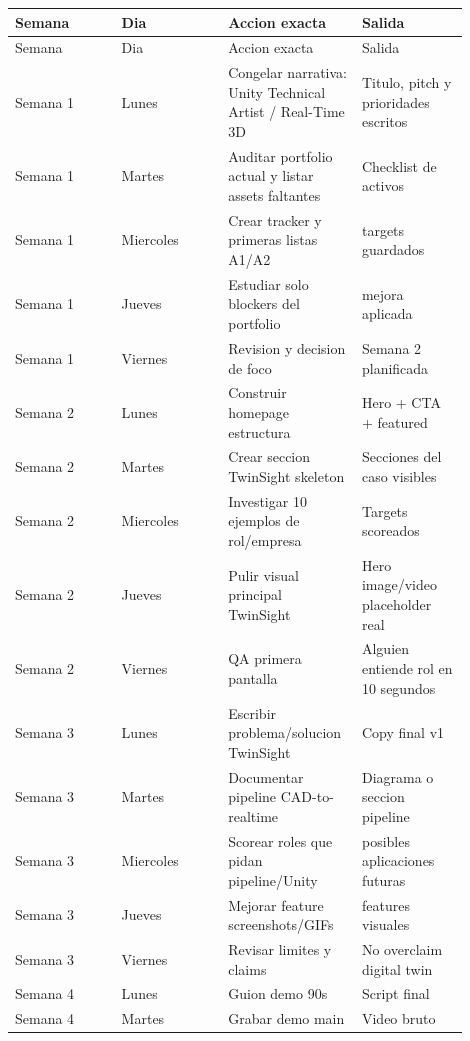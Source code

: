 \begin{center}
\scriptsize
\begin{longtable}{>{\raggedright\arraybackslash}p{0.225\linewidth} >{\raggedright\arraybackslash}p{0.225\linewidth} >{\raggedright\arraybackslash}p{0.225\linewidth} >{\raggedright\arraybackslash}p{0.225\linewidth}}
\toprule
Semana & Dia & Accion exacta & Salida \\
\midrule
\endfirsthead
\toprule
Semana & Dia & Accion exacta & Salida \\
\midrule
\endhead
Semana 1 & Lunes & Congelar narrativa: Unity Technical Artist / Real-Time 3D & Titulo, pitch y prioridades escritos \\
Semana 1 & Martes & Auditar portfolio actual y listar assets faltantes & Checklist de activos \\
Semana 1 & Miercoles & Crear tracker y primeras listas A1/A2 & 20 targets guardados \\
Semana 1 & Jueves & Estudiar solo blockers del portfolio & 1 mejora aplicada \\
Semana 1 & Viernes & Revision y decision de foco & Semana 2 planificada \\
Semana 2 & Lunes & Construir homepage estructura & Hero + CTA + featured \\
Semana 2 & Martes & Crear seccion TwinSight skeleton & Secciones del caso visibles \\
Semana 2 & Miercoles & Investigar 10 ejemplos de rol/empresa & Targets scoreados \\
Semana 2 & Jueves & Pulir visual principal TwinSight & Hero image/video placeholder real \\
Semana 2 & Viernes & QA primera pantalla & Alguien entiende rol en 10 segundos \\
Semana 3 & Lunes & Escribir problema/solucion TwinSight & Copy final v1 \\
Semana 3 & Martes & Documentar pipeline CAD-to-realtime & Diagrama o seccion pipeline \\
Semana 3 & Miercoles & Scorear roles que pidan pipeline/Unity & 5 posibles aplicaciones futuras \\
Semana 3 & Jueves & Mejorar feature screenshots/GIFs & 3 features visuales \\
Semana 3 & Viernes & Revisar limites y claims & No overclaim digital twin \\
Semana 4 & Lunes & Guion demo 90s & Script final \\
Semana 4 & Martes & Grabar demo main & Video bruto \\

\end{longtable}
\end{center}
